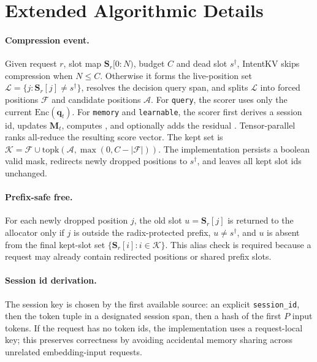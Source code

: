 \documentclass[11pt]{article}
\newcommand{\method}{IntentKV\xspace}
\begin{document}
\section{Extended Algorithmic Details}
\label{appendix:algos}

\paragraph{Compression event.}
Given request $r$, slot map $\mathbf{S}_r[0{:}N)$, budget $C$ and
dead slot $s^\dagger$, \method skips compression when $N\le C$.
Otherwise it forms the live-position set
$\mathcal{L}=\{j:\mathbf{S}_r[j]\ne s^\dagger\}$, resolves the
decision query span, and splits $\mathcal{L}$ into forced positions
$\mathcal{F}$ and candidate positions $\mathcal{A}$.
For \texttt{query}, the scorer uses only the current
$\mathrm{Enc}(\mathbf{q}_t)$.
For \texttt{memory} and \texttt{learnable}, the scorer first derives a
session id, updates $\mathbf{M}_t$, computes
, and optionally adds the residual
.
Tensor-parallel ranks all-reduce the resulting score vector.
The kept set is
$\mathcal{K}=\mathcal{F}\cup\mathrm{topk}(\mathcal{A},
\max(0,C-|\mathcal{F}|))$.
The implementation persists a boolean valid mask, redirects newly
dropped positions to $s^\dagger$, and leaves all kept slot ids
unchanged.

\paragraph{Prefix-safe free.}
For each newly dropped position $j$, the old slot
$u=\mathbf{S}_r[j]$ is returned to the allocator only if
$j$ is outside the radix-protected prefix, $u\ne s^\dagger$, and
$u$ is absent from the final kept-slot set
$\{\mathbf{S}_r[i]:i\in\mathcal{K}\}$.
This alias check is required because a request may already contain
redirected positions or shared prefix slots.

\paragraph{Session id derivation.}
The session key is chosen by the first available source:
an explicit \texttt{session\_id}, then the token tuple in a designated
session span, then a hash of the first $P$ input tokens.
If the request has no token ids, the implementation uses a
request-local key; this preserves correctness by avoiding accidental
memory sharing across unrelated embedding-input requests.
\end{document}
